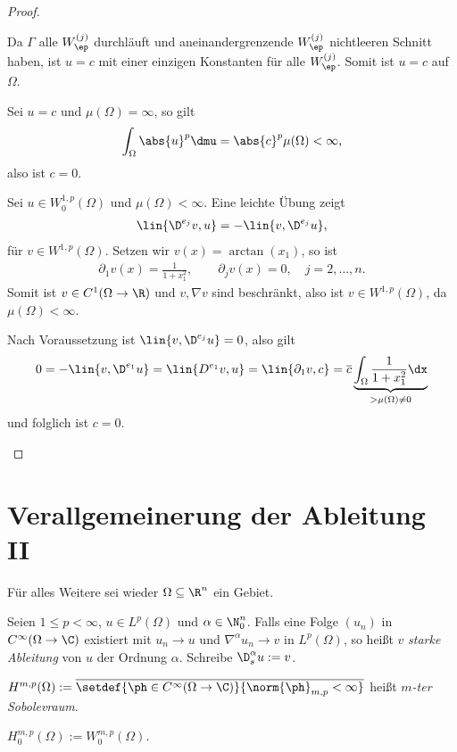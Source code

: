 \begin{proof}
\begin{proofenum}
\begin{enumerate}[label=\alph{*}),leftmargin=0pt]
Da $\Gamma$ alle $W_\ep^{(j)}$ durchläuft und aneinandergrenzende $W_\ep^{(j)}$
nichtleeren Schnitt haben, ist $u=c$ mit einer einzigen Konstanten für alle
$W_\ep^{(j)}$. Somit ist $u=c$ auf $\Omega$.
\end{enumerate}
\item Sei $u=c$ und $\mu(\Omega)=\infty$, so gilt
\begin{align*}
\int_\Omega \abs{u}^p \dmu = \abs{c}^p\mu(\Omega)< \infty,
\end{align*}
also ist $c=0$.
\item Sei $u\in W_0^{1,p}(\Omega)$ und $\mu(\Omega) < \infty$. Eine leichte
Übung zeigt
\begin{align*}
\lin{\D^{e_j}v,u} = -\lin{v,\D^{e_j}u},
\end{align*}
für $v\in W^{1,p}(\Omega)$.  Setzen wir $v(x) = \arctan(x_1)$, so ist
\begin{align*}
\partial_1 v(x) = \frac{1}{1+x_1^2},\qquad \partial_j v(x) = 0,\quad
j=2,\ldots,n.
\end{align*}
Somit ist $v\in C^1(\Omega\to\R)$ und $v,\nabla v$ sind beschränkt, also ist
$v\in W^{1,p}(\Omega)$, da $\mu(\Omega)<\infty$.

Nach Voraussetzung ist $\lin{v,\D^{e_j}u} = 0$, also gilt
\begin{align*}
0 = -\lin{v,\D^{e_1}u} = \lin{D^{e_1}v,u} = \lin{\partial_1 v, c}
= \overline{c} \underbrace{\int_\Omega \frac{1}{1+x_1^2}\dx}_{>\mu(\Omega)\neq
0}
\end{align*}
und folglich ist $c=0$.\qedhere
\end{proofenum}
\end{proof}

\section{Verallgemeinerung der Ableitung II}

Für alles Weitere sei wieder $\Omega\subseteq\R^n$ ein Gebiet.

\begin{defn}
\label{defn:7.38}
\begin{defnenum}
\item Seien $1\le p<\infty$, $u\in L^p(\Omega)$ und
$\alpha\in\N_0^n$. Falls eine Folge $(u_n)$ in $C^\infty(\Omega\to\C)$
existiert mit $u_n\to u$ und $\nabla^\alpha u_n \to v$ in $L^p(\Omega)$,
so heißt $v$ \emph{starke Ableitung} von $u$ der
Ordnung $\alpha$. Schreibe $\D^\alpha_s u := v$.
\item $H^{m,p}(\Omega) := \overline{\setdef{\ph\in
C^\infty(\Omega\to\C)}{\norm{\ph}_{m,p}<\infty}}$ heißt \emph{$m$-ter
Sobolevraum}.

$H_0^{m,p}(\Omega) := W_0^{m,p}(\Omega)$.\fishhere
\end{defnenum}
\end{defn}


